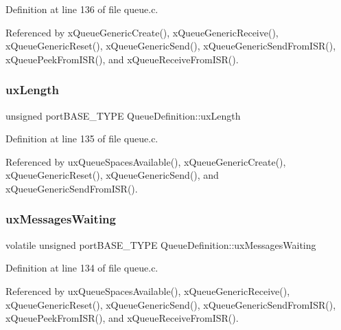 Definition at line 136 of file queue.\+c.



Referenced by x\+Queue\+Generic\+Create(), x\+Queue\+Generic\+Receive(), x\+Queue\+Generic\+Reset(), x\+Queue\+Generic\+Send(), x\+Queue\+Generic\+Send\+From\+I\+S\+R(), x\+Queue\+Peek\+From\+I\+S\+R(), and x\+Queue\+Receive\+From\+I\+S\+R().

\mbox{\label{structQueueDefinition_af1edbb7426dad16a57e1fc6bb475bc7e}} 
\subsubsection{\texorpdfstring{ux\+Length}{uxLength}}
{\footnotesize\ttfamily unsigned port\+B\+A\+S\+E\+\_\+\+T\+Y\+PE Queue\+Definition\+::ux\+Length}



Definition at line 135 of file queue.\+c.



Referenced by ux\+Queue\+Spaces\+Available(), x\+Queue\+Generic\+Create(), x\+Queue\+Generic\+Reset(), x\+Queue\+Generic\+Send(), and x\+Queue\+Generic\+Send\+From\+I\+S\+R().

\mbox{\label{structQueueDefinition_a8e3b24b25631daa65cc8b860346013e3}} 
\subsubsection{\texorpdfstring{ux\+Messages\+Waiting}{uxMessagesWaiting}}
{\footnotesize\ttfamily volatile unsigned port\+B\+A\+S\+E\+\_\+\+T\+Y\+PE Queue\+Definition\+::ux\+Messages\+Waiting}



Definition at line 134 of file queue.\+c.



Referenced by ux\+Queue\+Spaces\+Available(), x\+Queue\+Generic\+Receive(), x\+Queue\+Generic\+Reset(), x\+Queue\+Generic\+Send(), x\+Queue\+Generic\+Send\+From\+I\+S\+R(), x\+Queue\+Peek\+From\+I\+S\+R(), and x\+Queue\+Receive\+From\+I\+S\+R().

